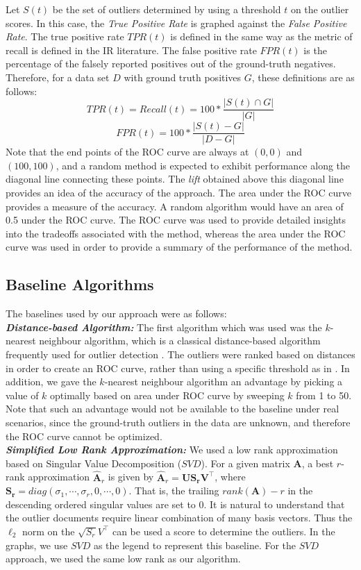 Let $S(t)$ be the set of outliers determined by using a threshold
$t$ on the outlier scores. In this case,  the {\em True Positive
Rate} is graphed against the {\em False Positive Rate}. The true
positive rate $TPR(t)$ is defined in the same way as the metric of
recall is defined in the IR literature. The false positive rate
$FPR(t)$ is the percentage of the falsely reported positives out of
the ground-truth negatives. Therefore, for a data set $D$ with
ground truth positives $G$, these definitions are as follows:
\begin{equation*}
TPR(t)= Recall(t)= 100* \frac{ |S(t) \cap G|}{|G|}
\end{equation*}
\begin{equation*}
FPR(t) =100 * \frac{|S(t) -G|}{|D - G|}
\end{equation*}
 Note that the end points of the ROC curve are
always at $(0, 0)$ and $(100, 100)$, and a random method is expected
to exhibit performance along the diagonal line connecting these
points. The {\em lift} obtained above this diagonal line provides an
idea of the accuracy of the approach. The area under the ROC curve
provides a measure of the accuracy. A random algorithm would have an
area of 0.5 under the ROC curve. The ROC curve was used to provide
detailed insights into the tradeoffs associated with the method,
whereas the area under the ROC curve was used in  order to provide a
summary of the performance of the method.
\subsection{Baseline Algorithms}
The baselines  used by our approach were as follows:\\
{\bf\em Distance-based Algorithm:}  The first algorithm which was
used was the
 $k$-nearest neighbour algorithm, which is a classical distance-based algorithm
 frequently used for outlier detection \cite{knorr,rama}. The
 outliers were ranked based on distances in order to create an ROC
 curve, rather than using a specific threshold as in \cite{knorr}. In addition, we
 gave the $k$-nearest neighbour algorithm an advantage by picking a value of $k$ optimally
 based on area under ROC curve by sweeping $k$ from 1 to 50. Note that such an advantage would
 not be available to the baseline under real scenarios, since the ground-truth
 outliers in the data are unknown, and therefore the ROC curve cannot be optimized.\\
{\bf\em Simplified Low Rank Approximation:} We used a low rank
approximation based on Singular Value Decomposition ($SVD$). For a
 given matrix $\mathbf{A}$, a best $r$-rank approximation $\hat{\mathbf{A}}_r$ is given by
 $\hat{\mathbf{A}}_r = \mathbf{US_rV^\intercal}$, where \linebreak $\mathbf{S_r}=diag(\sigma_1,\cdots,\sigma_r,0,\cdots,0)$.
 That is, the trailing $rank(\mathbf{A})-r$ in the descending ordered singular values are set to $0$.
 It is natural to understand that the outlier documents require
 linear combination of many basis vectors. Thus the $\ell_2$ norm
on the $\sqrt{S_r}V^\intercal$ can be used a score to determine the outliers. In the graphs, we use $SVD$
 as the legend to represent this baseline. For the $SVD$ approach,
 we used the same low rank as our algorithm.

